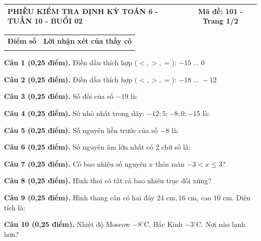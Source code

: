 \documentclass[12pt,a4paper]{article}
\begin{document}
\pagestyle{empty}
\noindent
\begin{tabularx}{\linewidth}{|X|c|}
\hline
\textbf{PHIẾU KIỂM TRA ĐỊNH KỲ TOÁN 6 - TUẦN 10 - BUỔI 02} & \textbf{Mã đề: 101 - Trang 1/2} \\
\hline
\end{tabularx}

\vspace{1.0mm}

\noindent
\begin{tabularx}{\linewidth}{|p{3.2cm}|X|}
\hline
\centering\textbf{Điểm số} & \centering\textbf{Lời nhận xét của thầy cô} \tabularnewline
\rule{0pt}{1.8cm} & \\
\hline
\end{tabularx}

\vspace{1.0mm}

\noindent\textbf{Câu 1 (0,25 điểm).} Điền dấu thích hợp ($<, >, =$): $-15 \; \dots \; 0$ \shortans{$<$}\par\vspace{0.25mm}
\noindent\textbf{Câu 2 (0,25 điểm).} Điền dấu thích hợp ($<, >, =$): $-18 \; \dots \; -12$ \shortans{$<$}\par\vspace{0.25mm}
\noindent\textbf{Câu 3 (0,25 điểm).} Số đối của số $-19$ là: \par\vspace{0.25mm}
\noindent\textbf{Câu 4 (0,25 điểm).} Số nhỏ nhất trong dãy: $-12; 5; -8; 0; -15$ là: \par\vspace{0.25mm}
\noindent\textbf{Câu 5 (0,25 điểm).} Số nguyên liền trước của số $-8$ là: \par\vspace{0.25mm}
\noindent\textbf{Câu 6 (0,25 điểm).} Số nguyên âm lớn nhất có 2 chữ số là: \par\vspace{0.25mm}
\noindent\textbf{Câu 7 (0,25 điểm).} Có bao nhiêu số nguyên $x$ thỏa mãn $-3 < x \le 3$? \par\vspace{0.25mm}
\noindent\textbf{Câu 8 (0,25 điểm).} Hình thoi có tất cả bao nhiêu trục đối xứng? \par\vspace{0.25mm}
\noindent\textbf{Câu 9 (0,25 điểm).} Hình thang cân có hai đáy $24\text{ cm}, 16\text{ cm}$, cao $10\text{ cm}$. Diện tích là: \par\vspace{0.25mm}
\noindent\textbf{Câu 10 (0,25 điểm).} Nhiệt độ Moscow $-8^\circ\text{C}$, Bắc Kinh $-3^\circ\text{C}$. Nơi nào lạnh hơn? \par\vspace{0.25mm}
\end{document}
